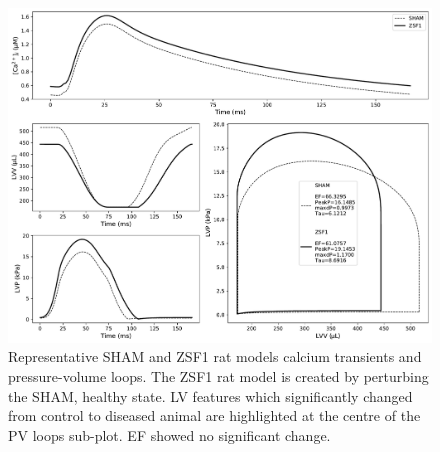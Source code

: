 \begin{figure}[ht!]
    \myfloatalign
    \includegraphics[width=\textwidth]{figures/chapter07/w1_resulting_bestfit_ca_and_pvloop.pdf}
    \caption{Representative SHAM and ZSF1 rat models calcium transients and pressure-volume loops. The ZSF1 rat model is created by perturbing the SHAM, healthy state. LV features which significantly changed from control to diseased animal are highlighted at the centre of the PV loops sub-plot. EF showed no significant change.}
    \label{fig:shamandzsf1ratmodels}
\end{figure}

